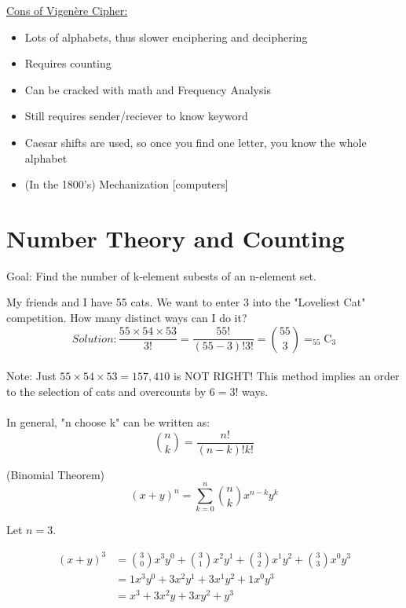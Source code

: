 \underline{Cons of Vigen\`ere Cipher:}
\begin{itemize}
\item Lots of alphabets, thus slower enciphering and deciphering
\item Requires counting
\item Can be cracked with math and Frequency Analysis
\item Still requires sender/reciever to know keyword
\item Caesar shifts are used, so once you find one letter, you know the whole alphabet
\item (In the 1800's) Mechanization [computers]
\end{itemize}

\section{Number Theory and Counting}

Goal: Find the number of k-element subests of an n-element set.

\begin{example} My friends and I have 55 cats. We want to enter 3 into the "Loveliest Cat" competition. How many distinct ways can I do it? \\

$$Solution: \frac{55 \times 54 \times 53}{3!} = \frac{55!}{(55-3)!3!} = \binom{55}{3} = _{55}\mathrm{C}_{3}$$\\

Note: Just $55 \times 54 \times 53 = 157,410$ is NOT RIGHT! This method implies an order to the selection of cats and overcounts by $6 = 3!$ ways.\\ \\
In general, "n choose k" can be written as: $$ \binom{n}{k} = \frac{n!}{(n-k)!k!}$$
\end{example}

\begin{theorem} (Binomial Theorem)\\
$$ (x + y)^{n} = \sum_
{k=0}^{n}
{\binom{n}{k}} x^{n-k} y^{k}
$$\end{theorem}

\begin{example}
Let $n=3$.

\begin{align*}
(x + y)^3 &= \binom{3}{0}x^{3}y^{0} + \binom{3}{1}x^{2}y^{1} + \binom{3}{2}x^{1}y^{2} + \binom{3}{3}x^{0}y^{3}\\
&= 1x^{3}y^{0} + 3x^{2}y^{1} + 3x^{1}y^{2} + 1x^{0}y^{3}\\ 
&= x^{3} + 3x^{2}y + 3xy^{2} + y^{3}
\end{align*}
\end{example}


